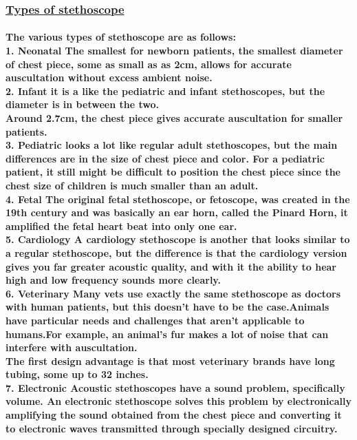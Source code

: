 \documentclass[12pt]{article}
\begin{document}
    \subsubsection{\underline{Types of stethoscope}}
    \paragraph{The various types of stethoscope are as follows:
   	    \\\textbf{1. Neonatal} The smallest for newborn patients, the smallest diameter of chest piece, some as small as as 2cm, allows for accurate auscultation without excess ambient noise.
    	\\\textbf{2. Infant}  it is a  like the pediatric and infant stethoscopes, but the diameter is in between the two. \\Around 2.7cm, the chest piece gives accurate auscultation for smaller patients.
    	\\\textbf{3. Pediatric} looks a lot like regular adult stethoscopes, but the main differences are in the size of chest piece and color. For a pediatric patient, it still might be difficult to position the chest piece since the chest size of children is much smaller than an adult.
    	\\\textbf{4. Fetal} The original fetal stethoscope, or fetoscope, was created in the 19th century and was basically an ear horn, called the Pinard Horn, it amplified the fetal heart beat into only one ear.
    	\\\textbf{5. Cardiology} A cardiology stethoscope is another that looks similar to a regular stethoscope, but the difference is that the cardiology version gives you far greater acoustic quality, and with it the ability to hear high and low frequency sounds more clearly.
    	\\\textbf{6. Veterinary} Many vets use exactly the same stethoscope as doctors with human patients, but this doesn’t have to be the case.Animals have particular needs and challenges that aren’t applicable to humans.For example, an animal’s fur makes a lot of noise that can interfere with auscultation.\\	The first design advantage is that most veterinary brands have long tubing, some up to 32 inches.
    	\\\textbf{7. Electronic} Acoustic stethoscopes have a sound problem, specifically volume. An electronic stethoscope solves this problem by electronically amplifying the sound obtained from the chest piece and converting it to electronic waves transmitted through specially designed circuitry.
}
\end{document}
